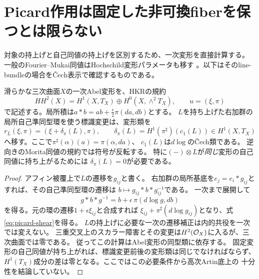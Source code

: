 \section{Picard作用は固定した非可換fiberを保つとは限らない}\label{sec:picard-first-order}
対象の持上げと自己同値の持上げを区別するため、一次変形を直接計算する。
一般のFourier--Mukai同値はHochschild変形パラメータも移す
\cite[Theorem 1.1]{Toda}。以下はそのline-bundleの場合をČech表示で確認するものである。

\begin{proposition}[一次の標識変更障害]\label{prop:picard-first-order}
滑らかな三次曲面$X$の一次Abel変形を、HKRの規約
\[
 HH^2(X)=H^1(X,T_X)\oplus H^0(X,\wedge^2T_X),\qquad u=(\xi,\pi)
\]
で記述する。局所積は$a*b=ab+\frac\epsilon2\pi(da,db)$とする。
$L$を持ち上げた右加群の局所自己準同型環を使う標識変更は、変形類を
\begin{equation}\label{eq:picard-shear}
 r_L(\xi,\pi)=(\xi+\delta_\pi(L),\pi),\qquad
 \delta_\pi(L)=H^1(\pi^\sharp)(c_1(L))\in H^1(X,T_X)
\end{equation}
へ移す。ここで$\pi^\sharp(\alpha)(a)=\pi(\alpha,da)$、
$c_1(L)$は$d\log$のČech類である。
逆向きのMorita同値の規約では符号が反転する。
特に$(-)\otimes L$が\emph{同じ}変形の自己同値に持ち上がるためには
$\delta_\pi(L)=0$が必要である。
\end{proposition}
\begin{proof}
アフィン被覆上で$L$の遷移を$g_{ij}$と書く。
右加群の局所基底を$e_j=e_i*g_{ij}$とすれば、その自己準同型環の遷移は
$b\mapsto g_{ij}*b*g_{ij}^{-1}$である。
一次まで展開して
\[
 g*b*g^{-1}=b+\epsilon\,\pi(d\log g,db)
\]
を得る。元の環の遷移$1+\epsilon\xi_{ij}$と合成すれば
$\xi_{ij}+\pi^\sharp(d\log g_{ij})$となり、式\eqref{eq:picard-shear}を得る。
$L$の持上げに必要な一次の遷移補正は内的共役を一次では変えない。
三重交叉上のスカラー障害とその変更は$H^2(\mathcal O_X)$に入るが、三次曲面では零である。
従ってこの計算はAbel変形の同型類に依存する。
固定変形の自己同値が持ち上がれば、標識変更前後の変形類は同じでなければならず、
$H^1(T_X)$成分の差は零となる。ここではこの必要条件から高次Artin底上の
十分性を結論していない。
\end{proof}


